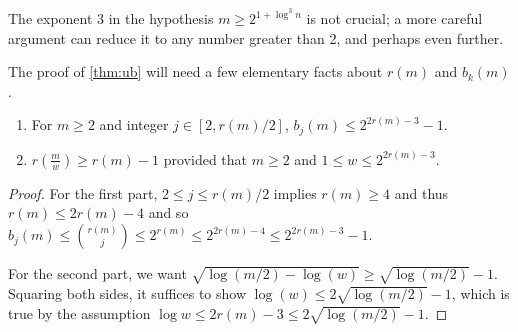 \documentclass[unicode,review]{siamart1116}
\numberwithin{theorem}{section}
\begin{document}
The exponent 3 in the hypothesis $m\geq 2^{1+\log^3 n}$ is not crucial; a more careful argument can reduce it to any
number greater than 2, and perhaps even further.

The proof of \cref{thm:ub} will need a few elementary facts about $r(m)$ and $b_k(m)$.

\begin{proposition}
\label{prop:technical}
\begin{enumerate}
\item For $m \geq 2$ and integer $j \in [2,r(m)/2]$, $b_j(m) \leq 2^{2r(m)-3}-1$.
\item $r(\frac{m}{w}) \geq r(m)-1$ provided that $m \geq 2$ and $1 \leq w \leq 2^{2r(m)-3}$.
\end{enumerate}
\end{proposition}
\begin{proof}
For the first part, $2 \leq j \leq r(m)/2$ implies $r(m) \geq 4$ and thus
$r(m) \leq 2r(m)-4$ and so $b_j(m) \leq \binom{r(m)}{j} \leq 2^{r(m)} \leq 2^{2r(m)-4} \leq 2^{2r(m)-3}-1$.

For the second part,  we want $\sqrt{\log (m/2) - \log(w)} \geq \sqrt{\log (m/2)} -1$.  Squaring both sides, it suffices to show $\log(w) \leq 2\sqrt{\log(m/2)}-1$,
which is true  by the assumption $\log w \leq 2r(m)-3 \leq 2\sqrt{\log (m/2)}-1$.
\end{proof}
\end{document}
